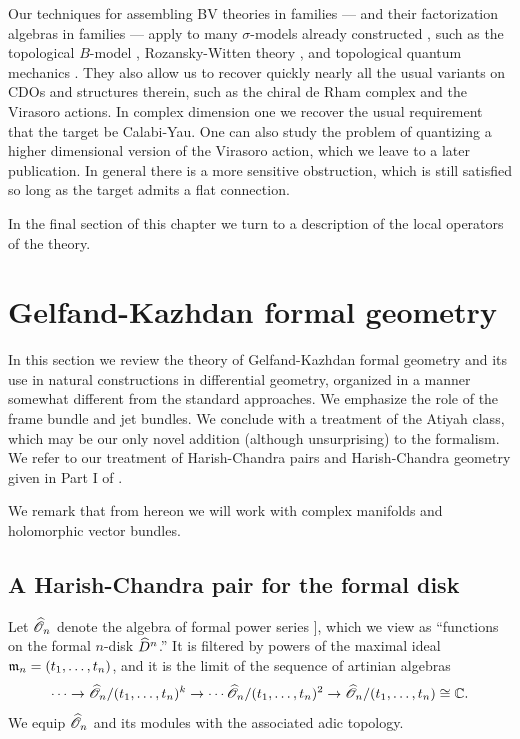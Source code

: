 Our techniques for assembling BV theories in families --- and their factorization algebras in families --- apply to many $\sigma$-models already constructed , such as the topological $B$-model \cite{LiLi}, Rozansky-Witten theory \cite{CLL}, and topological quantum mechanics \cite{GG1, GLL}. 
They also allow us to recover quickly nearly all the usual variants on CDOs and structures therein, such as the chiral de Rham complex and the Virasoro actions.
In complex dimension one we recover the usual requirement that the target be Calabi-Yau.
One can also study the problem of quantizing a higher dimensional version of the Virasoro action, which we leave to a later publication. 
In general there is a more sensitive obstruction, which is still satisfied so long as the target admits a flat connection.

In the final section of this chapter we turn to a description of the local operators of the theory. 

\section{Gelfand-Kazhdan formal geometry} \label{sec: gk formal geometry}

In this section we review the theory of Gelfand-Kazhdan formal geometry and its use in natural constructions in differential geometry, organized in a manner somewhat different from the standard approaches.
We emphasize the role of the frame bundle and jet bundles.
We conclude with a treatment of the Atiyah class, which may be our only novel addition (although unsurprising) to the formalism.
We refer to our treatment of Harish-Chandra pairs and Harish-Chandra geometry given in Part I of \cite{GGW}.

We remark that from hereon we will work with complex manifolds and holomorphic vector bundles.
 
\subsection{A Harish-Chandra pair for the formal disk}

Let $\widehat{\mathscr O}_n$ denote the algebra of formal power series 
\ben
\CC [[ t_1,\ldots,t_n ]],
\een 
which we view as ``functions on the formal $n$-disk $\widehat{D}^n$.'' 
It is filtered by powers of the maximal ideal ${\mathfrak m}_n = (t_1,\ldots,t_n)$, and it is the limit of the sequence of artinian algebras
\[
\cdots \to \widehat{\mathscr O}_n/(t_1,\ldots,t_n)^k \to \cdots \widehat{\mathscr O}_n/(t_1,\ldots,t_n)^2 \to \widehat{\mathscr O}_n/(t_1,\ldots,t_n) \cong \mathbb C.
\] 
We equip $\widehat{\mathscr O}_n$ and its modules with the associated adic topology.

